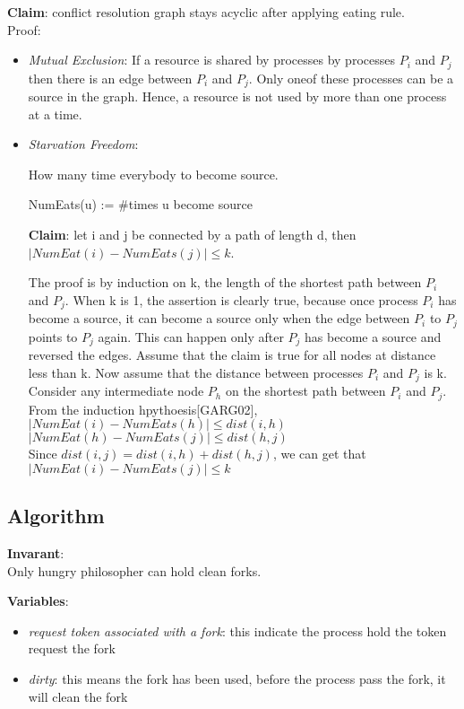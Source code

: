 \documentclass[twoside]{article}
\renewcommand{\cite}[1]{[#1]}
\begin{document}
\textbf{Claim}: conflict resolution graph stays acyclic after applying eating rule.\\ 
Proof:\\ 
\begin{itemize}
\item {\it Mutual Exclusion}: If a resource is shared by processes by processes $P_i$
and $P_j$ then there is an edge between $P_i$ and $P_j$. Only oneof these processes can
be a source in the graph. Hence, a resource is not used by more than one process at a time.

\item {\it Starvation Freedom}: 

How many time everybody to become source.

NumEats(u) := \#times u become source

\textbf{Claim}: let i and j be connected by a path of length d, then $|NumEat(i) - NumEats(j)| \leq k$.

The proof is by induction on k, the length of the shortest path between $P_i$ and $P_j$.
When k is 1, the assertion is clearly true, because once process $P_i$ has become a source,
it can become a source only when the edge between $P_i$ to $P_j$ points to $P_j$ again.
This can happen only after $P_j$ has become a source and reversed the edges. Assume that
the claim is true for all nodes at distance less than k. Now assume that the distance
between processes $P_i$ and $P_j$ is k. Consider any intermediate node $P_h$ on the shortest
path between $P_i$ and $P_j$. From the induction hpythoesis\cite{GARG02},\\

$|NumEat(i) - NumEats(h)| \leq dist(i,h)$\\

$|NumEat(h) - NumEats(j)| \leq dist(h,j)$\\

Since $dist(i,j) = dist(i,h) + dist(h,j)$, we can get that\\

$|NumEat(i) - NumEats(j)| \leq k$
\end{itemize} 

\subsection{Algorithm}
\textbf{Invarant}: \\
Only hungry philosopher can hold clean forks.

\textbf{Variables}:
\begin{itemize}
\item {\it request token associated with a fork}: this indicate the process hold the token
request the fork
\item {\it dirty}: this means the fork has been used, before the process pass the fork, it
will clean the fork

\end{itemize}
\end{document}
